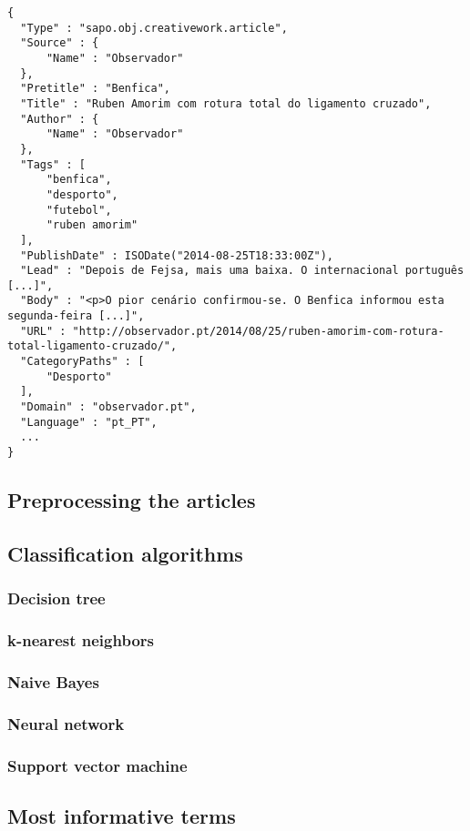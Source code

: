 \documentclass[conference]{IEEEtran}
\begin{document}
\begin{lstlisting}[caption={Example of JSON representation of an article},label={lst:article}, extendedchars=true]
{
  "Type" : "sapo.obj.creativework.article",
  "Source" : {
      "Name" : "Observador"
  },
  "Pretitle" : "Benfica",
  "Title" : "Ruben Amorim com rotura total do ligamento cruzado",
  "Author" : {
      "Name" : "Observador"
  },
  "Tags" : [
      "benfica",
      "desporto",
      "futebol",
      "ruben amorim"
  ],
  "PublishDate" : ISODate("2014-08-25T18:33:00Z"),
  "Lead" : "Depois de Fejsa, mais uma baixa. O internacional português [...]",
  "Body" : "<p>O pior cenário confirmou-se. O Benfica informou esta segunda-feira [...]",
  "URL" : "http://observador.pt/2014/08/25/ruben-amorim-com-rotura-total-ligamento-cruzado/",
  "CategoryPaths" : [
      "Desporto"
  ],
  "Domain" : "observador.pt",
  "Language" : "pt_PT",
  ...
}
\end{lstlisting}

\subsection{Preprocessing the articles}

\subsection{Classification algorithms}
\subsubsection{Decision tree}
\subsubsection{k-nearest neighbors}
\subsubsection{Naive Bayes}
\subsubsection{Neural network}
\subsubsection{Support vector machine}

\subsection{Most informative terms}
\end{document}
